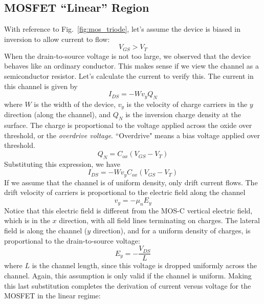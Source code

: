 \subsection{MOSFET ``Linear'' Region}
With reference to Fig.~\ref{fig:mos_triode}, let's assume the device is biased in inversion to allow current to flow:
    \begin{equation}
        {V_{GS}} > {V_{T}}
    \end{equation}
When the drain-to-source voltage is not too large, we observed that the device behaves like an ordinary conductor.  This makes sense if we view the channel as a semiconductor resistor.  Let's calculate the current to verify this.  
The current in this channel is given by
    \begin{equation}
        {I_{DS}} =  - W{v_y}{Q_N}
    \end{equation}
where $W$ is the width of the device, $v_y$ is the velocity of charge carriers in the $y$ direction (along the channel), and $Q_N$ is the inversion charge density at the surface.  
The charge is proportional to the voltage applied across the oxide over threshold, or the \emph{overdrive voltage}.  ``Overdrive" means a bias voltage applied over threshold.
    \begin{equation}
        {Q_N} = {C_{ox}}({V_{GS}} - {V_{T}})
    \end{equation}
Substituting this expression, we have
    \begin{equation}
        {I_{DS}} =  - W{v_y}{C_{ox}}({V_{GS}} - {V_{T}})
    \end{equation}
If we assume that the channel is of uniform density, only drift current flows.  The drift velocity of carriers is proportional to the electric field along the channel
    \begin{equation}
        {v_y} =  - {\mu _n}{E_y}
    \end{equation}
Notice that this electric field is different from the MOS-C vertical electric field, which is in the $x$ direction, with all field lines terminating on charges.  The lateral field is along the channel ($y$ direction), and for a uniform density of charges, is proportional to the drain-to-source voltage:
    \begin{equation}
        {E_y} =  - \frac{{{V_{DS}}}}{L}
    \end{equation}
where $L$ is the channel length, since this voltage is dropped uniformly across the channel.  Again, this assumption is only valid if the channel is uniform.  Making this last substitution completes the derivation of current versus voltage for the MOSFET in the linear regime:
